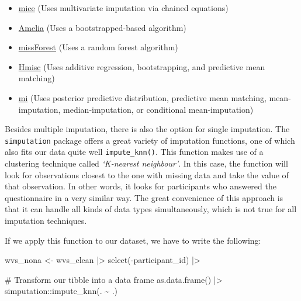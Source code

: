 \documentclass[
  letterpaper,
  DIV=11,
  numbers=noendperiod]{scrreprt}
\newenvironment{Shaded}{\begin{snugshade}}{\end{snugshade}}
\newcommand{\CommentTok}[1]{\textcolor[rgb]{0.37,0.37,0.37}{#1}}
\newcommand{\FunctionTok}[1]{\textcolor[rgb]{0.28,0.35,0.67}{#1}}
\newcommand{\NormalTok}[1]{\textcolor[rgb]{0.00,0.23,0.31}{#1}}
\newcommand{\OtherTok}[1]{\textcolor[rgb]{0.00,0.23,0.31}{#1}}
\newcommand{\SpecialCharTok}[1]{\textcolor[rgb]{0.37,0.37,0.37}{#1}}
\begin{document}
\begin{itemize}
\item
  \href{https://cran.r-project.org/web/packages/Amelia/index.html}{mice}
  (Uses multivariate imputation via chained equations)
\item
  \href{https://cran.r-project.org/web/packages/Amelia/index.html}{Amelia}
  (Uses a bootstrapped-based algorithm)
\item
  \href{https://cran.r-project.org/web/packages/missForest/index.html}{missForest}
  (Uses a random forest algorithm)
\item
  \href{https://cran.r-project.org/web/packages/Hmisc/index.html}{Hmisc}
  (Uses additive regression, bootstrapping, and predictive mean
  matching)
\item
  \href{https://cran.r-project.org/web/packages/mi/index.html}{mi} (Uses
  posterior predictive distribution, predictive mean matching,
  mean-imputation, median-imputation, or conditional mean-imputation)
\end{itemize}

Besides multiple imputation, there is also the option for single
imputation. The \texttt{simputation} package offers a great variety of
imputation functions, one of which also fits our data quite well
\texttt{impute\_knn()}. This function makes use of a clustering
technique called \emph{`K-nearest neighbour'}. In this case, the
function will look for observations closest to the one with missing data
and take the value of that observation. In other words, it looks for
participants who answered the questionnaire in a very similar way. The
great convenience of this approach is that it can handle all kinds of
data types simultaneously, which is not true for all imputation
techniques.

If we apply this function to our dataset, we have to write the
following:

\begin{Shaded}
\begin{Highlighting}[]
\NormalTok{wvs\_nona }\OtherTok{\textless{}{-}}
\NormalTok{  wvs\_clean }\SpecialCharTok{|\textgreater{}}
  \FunctionTok{select}\NormalTok{(}\SpecialCharTok{{-}}\NormalTok{participant\_id) }\SpecialCharTok{|\textgreater{}}
  
  \CommentTok{\# Transform our tibble into a data frame}
  \FunctionTok{as.data.frame}\NormalTok{() }\SpecialCharTok{|\textgreater{}}
\NormalTok{  simputation}\SpecialCharTok{::}\FunctionTok{impute\_knn}\NormalTok{(. }\SpecialCharTok{\textasciitilde{}}\NormalTok{ .)}
\end{Highlighting}
\end{Shaded}
\end{document}
